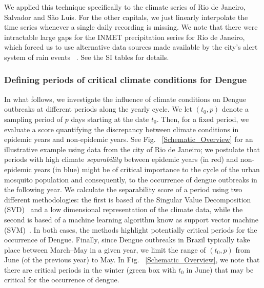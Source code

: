 \documentclass[final,leqno]{siamltexmm2}
\begin{document}
We applied this technique specifically to the climate series of Rio de Janeiro, Salvador and São Luís. 
For the other capitals, we just linearly interpolate the time series whenever a single daily 
recording is missing. We note that there were intractable large gaps for the INMET 
precipitation series for Rio de Janeiro, which forced us to use alternative data sources made available 
by the city's alert system of rain events ~\cite{Alertario}. See the SI tables for details. 


%
%
%
\subsubsection*{Defining periods of critical climate conditions for Dengue}
%
In what follows, we investigate the influence of climate conditions 
on Dengue outbreaks at different periods along the yearly cycle. We 
let \emph{$(t_0,p)$} denote a sampling period of $p$ days starting at the date $t_0$. 
Then, for a fixed period, we evaluate a score quantifying the discrepancy 
between climate conditions in epidemic years and non-epidemic years. 
See Fig. ~\ref{Schematic_Overview} for an illustrative example using data 
from the city of Rio de Janeiro; we postulate that periods with high climate 
\textit{separability} between epidemic years (in red) and non-epidemic years 
(in blue) might be of critical importance to the cycle of the urban mosquito population 
and consequently, to the occurrence of dengue outbreaks in the following year.  
We calculate the separability score of a period using two different methodologies:
the first is based of the Singular Value Decomposition (SVD)~\cite{Kutz} and a low dimensional 
representation of the climate data, while the second is based of a machine learning
algorithm know as support vector machine (SVM)~\cite{murphy,bishop}. In both cases, the methods 
highlight potentially critical periods for the occurrence of Dengue. Finally, 
since Dengue outbreaks in Brazil typically take place between March--May 
in a given year, we limit the range of  \emph{$(t_0,p)$} from June (of the previous year)
to May. In Fig. ~\ref{Schematic_Overview}, we note that there are critical periods
in the winter (green box with $t_0$ in June) that may be critical for the occurrence 
of dengue.
%
%
%
%
%
%
%
\end{document}
